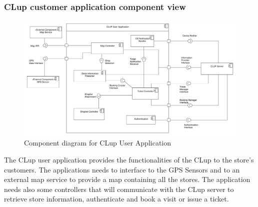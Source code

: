 \subsubsection{CLup customer application component view}
\begin{figure}[H]
    \includegraphics[width=\textwidth]{Images/UML_user_app_component.pdf}
    \caption{\label{fig:UML_comp_CLup_user_app}Component diagram for CLup User Application}
\end{figure}

The CLup user application provides the functionalities of the CLup to the store's customers. The applications needs to interface to the GPS Sensors and to an external map service to provide a map containing all the stores. The application needs also some controllers that will communicate with the CLup server to retrieve store information, authenticate and book a visit or issue a ticket.

